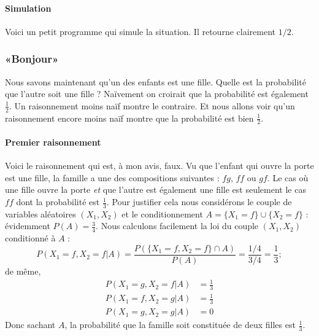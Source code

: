 \paragraph{Simulation}

Voici un petit programme qui simule la situation. Il retourne clairement \( 1/2\).


\subsubsection{«Bonjour»}

Nous savons maintenant qu'un des enfants est une fille. Quelle est la probabilité que l'autre soit une fille ? Naïvement on croirait que la probabilité est également \( \frac{ 1 }{2}\). Un raisonnement moins naïf montre le contraire. Et nous allons voir qu'un raisonnement encore moins naïf montre que la probabilité est bien \( \frac{ 1 }{2}\).

\paragraph{Premier raisonnement}

Voici le raisonnement qui est, à mon avis, faux. Vu que l'enfant qui ouvre la porte est une fille, la famille a une des compositions suivantes : \( fg\), \( ff\) ou \( gf\). Le cas où une fille ouvre la porte \emph{et} que l'autre est également une fille est seulement le cas \( ff\) dont la probabilité est \( \frac{1}{ 3 }\). Pour justifier cela nous considérons le couple de variables aléatoires \( \left( X_1,X_2 \right)\) et le conditionnement \( A=\{ X_1=f \}\cup\{ X_2=f \}\) : évidemment \( P(A)=\frac{ 3 }{ 4 }\). Nous calculons facilement la loi du couple \( (X_1,X_2)\) conditionné à \( A\) :
\begin{equation}
    P(X_1=f,X_2=f|A)=\frac{ P(  \{ X_1=f,X_2=f \}\cap A  ) }{ P(A) }=\frac{ 1/4 }{ 3/4 }=\frac{1}{ 3 };
\end{equation}
de même,
\begin{subequations}
    \begin{align}
        P(X_1=g,X_2=f|A)&=\frac{1}{ 3 }\\
        P(X_1=f,X_2=g|A)&=\frac{1}{ 3 }\\
        P(X_1=g,X_2=g|A)&=0
    \end{align}
\end{subequations}
Donc sachant \( A\), la probabilité que la famille soit constituée de deux filles est \( \frac{1}{ 3 }\).

